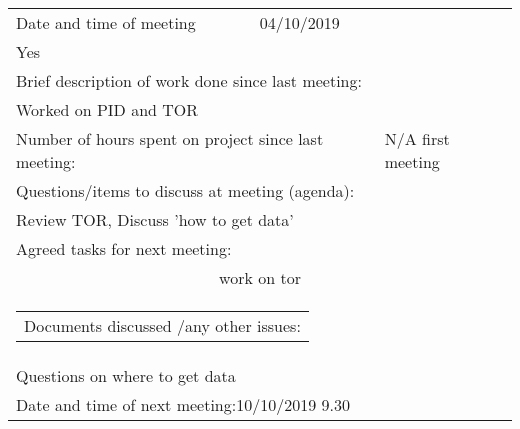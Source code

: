 
 \\
\smallskip
\\
\begin{tabularx}{\textwidth}{|X|X|X|}
     
\hline
Date and time of meeting                         &          04/10/2019               & \begin{tabular}[c]{@{}l@{}}As scheduled:  \\Yes\end{tabular} \\ \hline
\multicolumn{3}{|l|}{Brief description of work done since last meeting:}                                                                      \\ \hline
\multicolumn{3}{|l|}{Worked on PID and TOR}                                                                                                                     \\ \hline
\multicolumn{2}{|l|}{Number of hours spent on project since last meeting:} & N/A first meeting                    \\ \hline
\multicolumn{3}{|l|}{Questions/items to discuss at meeting (agenda):}  \\ \hline 
\multicolumn{3}{|l|}{Review TOR, 
Discuss 'how to get data'}     \\ \hline
\multicolumn{3}{|l|}{Agreed tasks for next meeting:}                                                                                          \\ \hline
\multicolumn{3}{|c|}{work on tor}                                                                                                                     \\ \hline
\multicolumn{3}{|l|}{\begin{tabular}[c]{@{}l@{}}Documents discussed /any other issues:\end{tabular}}                                        \\ \hline
\multicolumn{3}{|l|}{Questions on where to get data}                                                                                                                        \\ \hline
\multicolumn{3}{|l|}{Date and time of next meeting:10/10/2019 9.30}                             \\ \hline
\end{tabularx}
\\
\smallskip
\\
